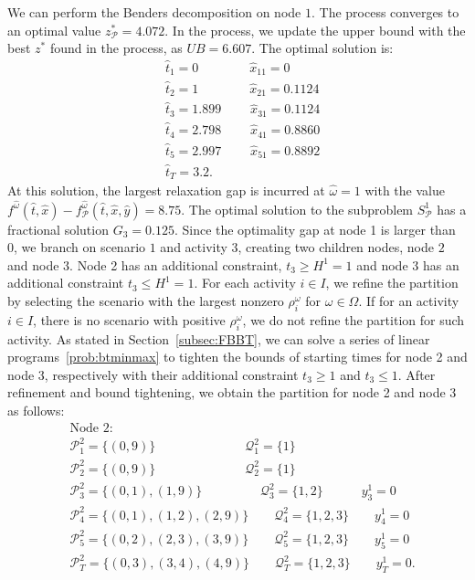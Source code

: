 \documentclass[11pt]{article}
\begin{document}
	We can perform the Benders decomposition on node \(1\). The process converges to an optimal value \(z^*_{\mathcal{P}} = 4.072\). In the process, we update the upper bound with the best \(z^*\) found in the process, as \(UB = 6.607\). The optimal solution is:
	\begin{align*}
	& \hat{t}_1 = 0 \qquad \qquad \hat{x}_{11} = 0\\
	& \hat{t}_2 = 1 \qquad \qquad \hat{x}_{21} = 0.1124\\
	& \hat{t}_3 = 1.899 \qquad \; \hat{x}_{31} = 0.1124\\
	& \hat{t}_4 = 2.798 \qquad \; \hat{x}_{41} = 0.8860\\
	& \hat{t}_5 = 2.997 \qquad \; \hat{x}_{51} = 0.8892\\
	& \hat{t}_T = 3.2.
	\end{align*}
	At this solution, the largest relaxation gap is incurred at \(\hat{\omega} = 1\) with the value \(f^{\hat{\omega}}(\hat{t},\hat{x}) - f^{\hat{\omega}}_{\mathcal{P}}(\hat{t},\hat{x},\hat{y}) = 8.75\). The optimal solution to the subproblem \(S^1_\mathcal{P}\) has a fractional solution \(G_3 = 0.125\). Since the optimality gap at node 1 is larger than 0, we branch on scenario \(1\) and activity \(3\), creating two children nodes, node \(2\) and node \(3\). Node 2 has an additional constraint, \(t_3 \geq H^1 = 1\) and node 3 has an additional constraint \(t_3 \leq H^1 = 1\). For each activity \(i \in I\), we refine the partition by selecting the scenario with the largest nonzero \(\rho_i^\omega\) for \(\omega \in \Omega\). If for an activity \(i \in I\), there is no scenario with positive \(\rho_i^\omega\), we do not refine the partition for such activity. As stated in Section~\ref{subsec:FBBT}, we can solve a series of linear programs~\eqref{prob:btminmax} to tighten the bounds of starting times for node 2 and node 3, respectively with their additional constraint \(t_3 \geq 1\) and \(t_3 \leq 1\). After refinement and bound tightening, we obtain the partition for node 2 and node 3 as follows:
	\begin{align*}
	& \text{Node 2:}\\
	&\mathcal{P}_1^2 = \{(0,9)\} \qquad \qquad \qquad \quad \mathcal{Q}_1^2 = \{1\}\\
	&\mathcal{P}_2^2 = \{(0,9)\} \qquad \qquad \qquad \quad \mathcal{Q}_2^2 = \{1\}\\
	&\mathcal{P}_3^2 = \{(0,1),(1,9)\} \qquad \qquad \;\; \mathcal{Q}_3^2 = \{1,2\} \qquad \quad  y_3^1 = 0\\
	&\mathcal{P}_4^2 = \{(0,1),(1,2),(2,9)\} \qquad  \mathcal{Q}_4^2 = \{1,2,3\} \qquad y_4^1 = 0\\
	&\mathcal{P}_5^2 = \{(0,2),(2,3),(3,9)\} \qquad  \mathcal{Q}_5^2 = \{1,2,3\} \qquad y_5^1 = 0\\
	&\mathcal{P}_T^2 = \{(0,3),(3,4),(4,9)\} \qquad  \mathcal{Q}_T^2 = \{1,2,3\} \qquad y_T^1 = 0.
	\end{align*}
\end{document}
